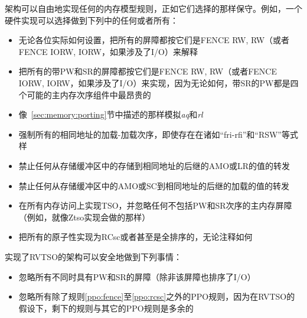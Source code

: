 架构可以自由地实现任何的内存模型规则，正如它们选择的那样保守。例如，一个硬件实现可以选择做到下列中的任何或者所有：
  \begin{itemize}
    \item 无论各位实际如何设置，把所有的屏障都按它们是FENCE RW, RW（或者FENCE IORW, IORW，如果涉及了I/O）来解释
    \item 把所有的带PW和SR的屏障都按它们是FENCE RW, RW（或者FENCE IORW, IORW，如果涉及了I/O）来实现，因为无论如何，带SR的PW都是四个可能的主内存次序组件中最昂贵的
    \item 像~\ref{sec:memory:porting}节中描述的那样模拟{\em aq}和{\em rl}
    \item 强制所有的相同地址的加载-加载次序，即使存在在诸如“fri-rfi”和“RSW”等式样
    \item 禁止任何从存储缓冲区中的存储到相同地址的后继的AMO或LR的值的转发
    \item 禁止任何从存储缓冲区中的AMO或SC到相同地址的后继的加载的值的转发
    \item 在所有内存访问上实现TSO，并忽略任何不包括PW和SR次序的主内存屏障（例如，就像Ztso实现会做的那样）
    \item 把所有的原子性实现为RCsc或者甚至是全排序的，无论注释如何
  \end{itemize}

实现了RVTSO的架构可以安全地做到下列事情：
\begin{itemize}
  \item 忽略所有不同时具有PW和SR的屏障（除非该屏障也排序了I/O）
  \item 忽略所有除了规则\ref{ppo:fence}至\ref{ppo:rcsc}之外的PPO规则，因为在RVTSO的假设下，剩下的规则与其它的PPO规则是多余的
\end{itemize}

